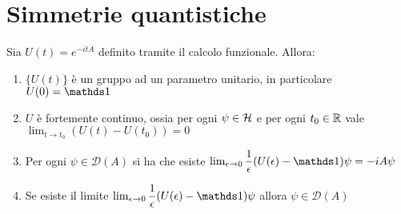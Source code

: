 \section{Simmetrie quantistiche}

\begin{theorem}
    Sia $U(t)=e^{-itA}$ definito tramite il calcolo funzionale. Allora: 
\begin{enumerate}
    \item $\{ U(t)\}$ è un gruppo ad un parametro unitario, in particolare $U(0)=\un$
    \item $U$ è fortemente continuo, ossia per ogni $\psi \in \operatorname{\mathcal{H}}$ e per ogni $t_0 \in \operatorname{\mathbb{R}}$ vale $\lim_{t \to t_0}(U(t)- U(t_0))=0$ 
    \item Per ogni $\psi \in \mathcal{D}(A)$ si ha che esiste $\lim_{\epsilon \to 0} \dfrac{1}{\epsilon}(U(\epsilon)- \un)\psi=-i A \psi$
    \item Se esiste il limite $\lim_{\epsilon \to 0} \dfrac{1}{\epsilon}(U(\epsilon)- \un)\psi$ allora $\psi \in \mathcal{D}(A)$
\end{enumerate}
\end{theorem}